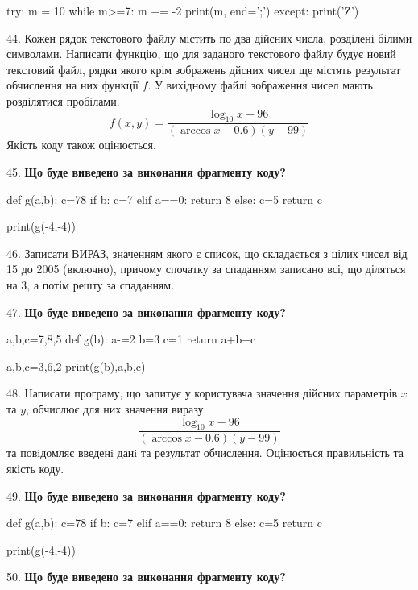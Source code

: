 \documentclass[11pt]{article}
\begin{document}
try:
    m = 10
    while m>=7:
        m += -2
    print(m, end=';')
except:
    print('Z')

\par\vspace{5mm}
44. 
Кожен рядок текстового файлу містить по два дійсних числа, розділені білими символами.
Написати функцію, що для заданого текстового файлу будує новий текстовий файл, рядки якого крім зображень дйсних чисел ще містять результат обчислення на них функції $f$. У вихідному файлі зображення чисел мають розділятися пробілами. 
$$f(x, y) =\frac{\log_{10} x - 96}{(\arccos x - 0.6) (y - 99)}$$ 
Якість коду також оцінюється.

\par\vspace{5mm}
45. \textbf{Що буде виведено за виконання фрагменту коду?}

def g(a,b):
    c=78
    if b:
        c=7
    elif a==0:
         return 8
    else: 
        c=5
    return c

print(g(-4,-4))
\par\vspace{5mm}
46. 
Записати ВИРАЗ, значенням якого є список, що складається з цілих чисел від 15 до 2005 (включно), причому спочатку за спаданням записано всі, що діляться на 3, а потім решту за спаданням.\par\vspace{5mm}
47. \textbf{Що буде виведено за виконання фрагменту коду?}

a,b,c=7,8,5
def g(b):
    a-=2
    b=3
    c=1
    return a+b+c

a,b,c=3,6,2
print(g(b),a,b,c)
\par\vspace{5mm}
48. 
Написати програму, що запитує у користувача значення дійсних параметрів $x$ та $y$, обчислює для них значення виразу 
$$\frac{\log_{10} x - 96}{(\arccos x - 0.6) (y - 99)}$$ 
та повiдомляє введенi данi та результат обчислення.
 Оцінюється правильність та якість коду.

\par\vspace{5mm}
49. \textbf{Що буде виведено за виконання фрагменту коду?}

def g(a,b):
    c=78
    if b:
        c=7
    elif a==0:
         return 8
    else: 
        c=5
    return c

print(g(-4,-4))\par\vspace{5mm}
50. \textbf{Що буде виведено за виконання фрагменту коду?}
\end{document}
